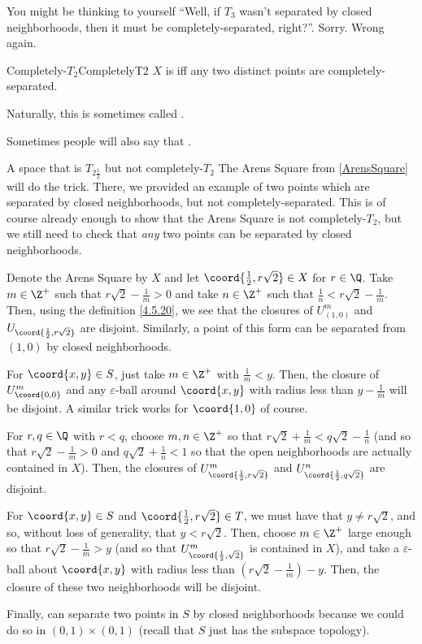 You might be thinking to yourself ``Well, if $T_3$ wasn't separated by closed neighborhoods, then it must be completely-separated, right?''.  Sorry.  Wrong again.
\begin{dfn}{Completely-$T_2$}{CompletelyT2}
$X$ is  iff any two distinct points are completely-separated.
\begin{rmk}
Naturally, this is sometimes called .
\end{rmk}
\begin{rmk}
Sometimes people will also say that .
\end{rmk}
\end{dfn}
\begin{exm}{A space that is $T_{2\frac{1}{2}}$ but not completely-$T_2$}{}
The Arens Square from \cref{ArensSquare} will do the trick.  There, we provided an example of two points which are separated by closed neighborhoods, but not completely-separated.  This is of course already enough to show that the Arens Square is not completely-$T_2$, but we still need to check that \emph{any} two points can be separated by closed neighborhoods.

Denote the Arens Square by $X$ and let $\coord{\frac{1}{2},r\sqrt{2}}\in X$ for $r\in \Q$.  Take $m\in \Z ^+$ such that $r\sqrt{2}-\frac{1}{m}>0$ and take $n\in \Z ^+$ such that $\frac{1}{n}<r\sqrt{2}-\frac{1}{m}$.  Then, using the definition \eqref{4.5.20}, we see that the closures of $U_{(1,0)}^m$ and $U_{\coord{\frac{1}{2},r\sqrt{2}}}$ are disjoint.  Similarly, a point of this form can be separated from $(1,0)$ by closed neighborhoods.

For $\coord{x,y}\in S$, just take $m\in \Z ^+$ with $\frac{1}{m}<y$.  Then, the closure of $U_{\coord{0,0}}^m$ and any $\varepsilon$-ball around $\coord{x,y}$ with radius less than $y-\frac{1}{m}$ will be disjoint.  A similar trick works for $\coord{1,0}$ of course.

For $r,q\in \Q$ with $r<q$, choose $m,n\in \Z ^+$ so that $r\sqrt{2}+\frac{1}{m}<q\sqrt{2}-\frac{1}{n}$ (and so that $r\sqrt{2}-\frac{1}{m}>0$ and $q\sqrt{2}+\frac{1}{n}<1$ so that the open neighborhoods are actually contained in $X$).  Then, the closures of $U_{\coord{\frac{1}{2},r\sqrt{2}}}^m$ and $U_{\coord{\frac{1}{2},q\sqrt{2}}}^n$ are disjoint.

For $\coord{x,y}\in S$ and $\coord{\frac{1}{2},r\sqrt{2}}\in T$, we must have that $y\neq r\sqrt{2}$, and so, without loss of generality, that $y<r\sqrt{2}$.  Then, choose $m\in \Z ^+$ large enough so that $r\sqrt{2}-\frac{1}{m}>y$ (and so that $U_{\coord{\frac{1}{2},\sqrt{2}}}^m$ is contained in $X$), and take a $\varepsilon$-ball about $\coord{x,y}$ with radius less than $(r\sqrt{2}-\frac{1}{m})-y$.  Then, the closure of these two neighborhoods will be disjoint.

Finally, can separate two points in $S$ by closed neighborhoods because we could do so in $(0,1)\times (0,1)$ (recall that $S$ just has the subspace topology).
\end{exm}
